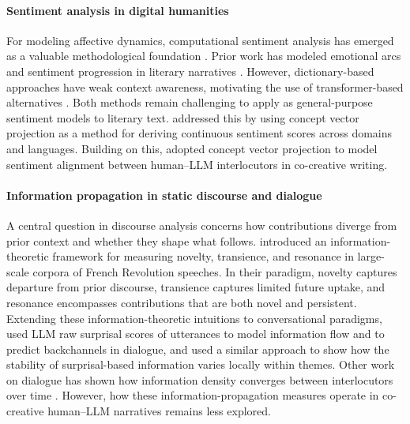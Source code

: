 \documentclass[11pt]{article}
\begin{document}
\paragraph{Sentiment analysis in digital humanities}
For modeling affective dynamics, computational sentiment analysis has emerged as a valuable methodological foundation \cite{mohammad2016sentiment}. Prior work has modeled emotional arcs and sentiment progression in literary narratives \citep{reagan2016emotional, hu2021dynamic, ohman2022computational}. However, dictionary-based approaches have weak context awareness, motivating the use of transformer-based alternatives \cite{feldkamp2024comparing}. Both methods remain challenging to apply as general-purpose sentiment models to literary text. \citet{Lyngbaek_2026} addressed this by using concept vector projection as a method for deriving continuous sentiment scores across domains and languages. Building on this, \citet{fundal2026directionalalignmentnarrativeagency} adopted concept vector projection to model sentiment alignment between human--LLM interlocutors in co-creative writing.  

\paragraph{Information propagation in static discourse and dialogue}
A central question in discourse analysis concerns how contributions diverge from prior context and whether they shape what follows. \citet{barron2018individuals} introduced an information-theoretic framework for measuring novelty, transience, and resonance in large-scale corpora of French Revolution speeches. In their paradigm, novelty captures departure from prior discourse, transience captures limited future uptake, and resonance encompasses contributions that are both novel and persistent. Extending these information-theoretic intuitions to conversational paradigms, \citet{bergey2024yeah} used LLM raw surprisal scores of utterances to model information flow and to predict backchannels in dialogue, and \citet{maes-etal-2022-shared} used a similar approach to show how the stability of surprisal-based information varies locally within themes. Other work on dialogue has shown how information density converges between interlocutors over time \cite{xu2018information}. However, how these information-propagation measures operate in co-creative human--LLM narratives remains less explored.

\end{document}
